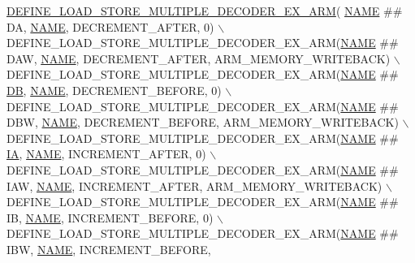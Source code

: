 \begin{DoxyCode}
\mbox{\hyperlink{decoder-arm_8c_a056ce03038f484c172fd8a83f22f073a}{DEFINE\_LOAD\_STORE\_MULTIPLE\_DECODER\_EX\_ARM}}(
      \mbox{\hyperlink{inflate_8h_a164ea0159d5f0b5f12a646f25f99eceaa67bc2ced260a8e43805d2480a785d312}{NAME}} ## DA,   \mbox{\hyperlink{inflate_8h_a164ea0159d5f0b5f12a646f25f99eceaa67bc2ced260a8e43805d2480a785d312}{NAME}}, DECREMENT\_AFTER, 0) \(\backslash\)
    DEFINE\_LOAD\_STORE\_MULTIPLE\_DECODER\_EX\_ARM(\mbox{\hyperlink{inflate_8h_a164ea0159d5f0b5f12a646f25f99eceaa67bc2ced260a8e43805d2480a785d312}{NAME}} ## DAW,  \mbox{\hyperlink{inflate_8h_a164ea0159d5f0b5f12a646f25f99eceaa67bc2ced260a8e43805d2480a785d312}{NAME}}, DECREMENT\_AFTER, 
      ARM\_MEMORY\_WRITEBACK) \(\backslash\)
    DEFINE\_LOAD\_STORE\_MULTIPLE\_DECODER\_EX\_ARM(\mbox{\hyperlink{inflate_8h_a164ea0159d5f0b5f12a646f25f99eceaa67bc2ced260a8e43805d2480a785d312}{NAME}} ## \mbox{\hyperlink{isa-thumb_8c_ad4dd2bbef91d8d1a17ca7b9ad41203cd}{DB}},   \mbox{\hyperlink{inflate_8h_a164ea0159d5f0b5f12a646f25f99eceaa67bc2ced260a8e43805d2480a785d312}{NAME}}, DECREMENT\_BEFORE, 0) \(\backslash\)
    DEFINE\_LOAD\_STORE\_MULTIPLE\_DECODER\_EX\_ARM(\mbox{\hyperlink{inflate_8h_a164ea0159d5f0b5f12a646f25f99eceaa67bc2ced260a8e43805d2480a785d312}{NAME}} ## DBW,  \mbox{\hyperlink{inflate_8h_a164ea0159d5f0b5f12a646f25f99eceaa67bc2ced260a8e43805d2480a785d312}{NAME}}, DECREMENT\_BEFORE, 
      ARM\_MEMORY\_WRITEBACK) \(\backslash\)
    DEFINE\_LOAD\_STORE\_MULTIPLE\_DECODER\_EX\_ARM(\mbox{\hyperlink{inflate_8h_a164ea0159d5f0b5f12a646f25f99eceaa67bc2ced260a8e43805d2480a785d312}{NAME}} ## \mbox{\hyperlink{isa-thumb_8c_a3048b70ae3e6d982e60f063bd78fda51}{IA}},   \mbox{\hyperlink{inflate_8h_a164ea0159d5f0b5f12a646f25f99eceaa67bc2ced260a8e43805d2480a785d312}{NAME}}, INCREMENT\_AFTER, 0) \(\backslash\)
    DEFINE\_LOAD\_STORE\_MULTIPLE\_DECODER\_EX\_ARM(\mbox{\hyperlink{inflate_8h_a164ea0159d5f0b5f12a646f25f99eceaa67bc2ced260a8e43805d2480a785d312}{NAME}} ## IAW,  \mbox{\hyperlink{inflate_8h_a164ea0159d5f0b5f12a646f25f99eceaa67bc2ced260a8e43805d2480a785d312}{NAME}}, INCREMENT\_AFTER, 
      ARM\_MEMORY\_WRITEBACK) \(\backslash\)
    DEFINE\_LOAD\_STORE\_MULTIPLE\_DECODER\_EX\_ARM(\mbox{\hyperlink{inflate_8h_a164ea0159d5f0b5f12a646f25f99eceaa67bc2ced260a8e43805d2480a785d312}{NAME}} ## IB,   \mbox{\hyperlink{inflate_8h_a164ea0159d5f0b5f12a646f25f99eceaa67bc2ced260a8e43805d2480a785d312}{NAME}}, INCREMENT\_BEFORE, 0) \(\backslash\)
    DEFINE\_LOAD\_STORE\_MULTIPLE\_DECODER\_EX\_ARM(\mbox{\hyperlink{inflate_8h_a164ea0159d5f0b5f12a646f25f99eceaa67bc2ced260a8e43805d2480a785d312}{NAME}} ## IBW,  \mbox{\hyperlink{inflate_8h_a164ea0159d5f0b5f12a646f25f99eceaa67bc2ced260a8e43805d2480a785d312}{NAME}}, INCREMENT\_BEFORE, 

\end{DoxyCode}
